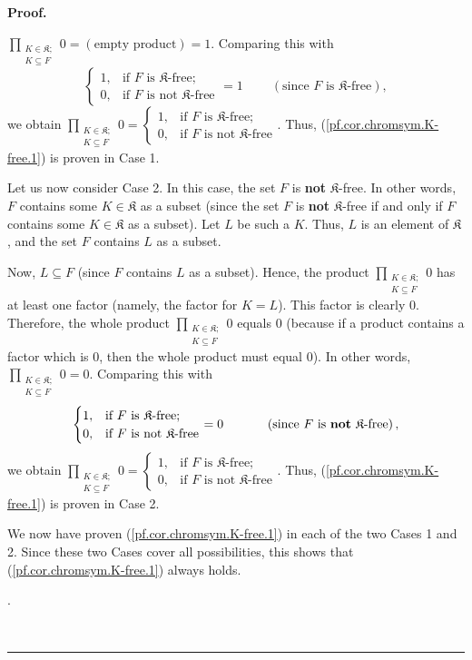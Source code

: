 \documentclass[numbers=enddot,12pt,final,onecolumn,notitlepage]{scrartcl}%
\theoremstyle{definition}
\newenvironment{proof}[1][Proof]{\noindent\textbf{#1.} }{\ \rule{0.5em}{0.5em}}
\newenvironment{verlong}{}{}
\let\prodnonlimits\prod
\renewcommand{\prod}{\prodnonlimits\limits}
\begin{document}
\begin{verlong}
\begin{proof}
{$\prod_{\substack{K\in\mathfrak{K};\\K\subseteq F}}0=\left(  \text{empty
product}\right)  =1$. Comparing this with
\[%
\begin{cases}
1, & \text{if }F\text{ is }\mathfrak{K}\text{-free;}\\
0, & \text{if }F\text{ is not }\mathfrak{K}\text{-free}%
\end{cases}
=1\ \ \ \ \ \ \ \ \ \ \left(  \text{since }F\text{ is }\mathfrak{K}%
\text{-free}\right)  ,
\]
we obtain $\prod_{\substack{K\in\mathfrak{K};\\K\subseteq F}}0=%
\begin{cases}
1, & \text{if }F\text{ is }\mathfrak{K}\text{-free;}\\
0, & \text{if }F\text{ is not }\mathfrak{K}\text{-free}%
\end{cases}
$. Thus, (\ref{pf.cor.chromsym.K-free.1}) is proven in Case 1.
\par
Let us now consider Case 2. In this case, the set $F$ is \textbf{not}
$\mathfrak{K}$-free. In other words, $F$ contains some $K\in\mathfrak{K}$ as a
subset (since the set $F$ is \textbf{not} $\mathfrak{K}$-free if and only if
$F$ contains some $K\in\mathfrak{K}$ as a subset). Let $L$ be such a $K$.
Thus, $L$ is an element of $\mathfrak{K}$, and the set $F$ contains $L$ as a
subset.
\par
Now, $L\subseteq F$ (since $F$ contains $L$ as a subset). Hence, the product
$\prod_{\substack{K\in\mathfrak{K};\\K\subseteq F}}0$ has at least one factor
(namely, the factor for $K=L$). This factor is clearly $0$. Therefore, the
whole product $\prod_{\substack{K\in\mathfrak{K};\\K\subseteq F}}0$ equals $0$
(because if a product contains a factor which is $0$, then the whole product
must equal $0$). In other words, $\prod_{\substack{K\in\mathfrak{K}%
;\\K\subseteq F}}0=0$. Comparing this with
\[%
\begin{cases}
1, & \text{if }F\text{ is }\mathfrak{K}\text{-free;}\\
0, & \text{if }F\text{ is not }\mathfrak{K}\text{-free}%
\end{cases}
=0\ \ \ \ \ \ \ \ \ \ \left(  \text{since }F\text{ is \textbf{not}
}\mathfrak{K}\text{-free}\right)  ,
\]
we obtain $\prod_{\substack{K\in\mathfrak{K};\\K\subseteq F}}0=%
\begin{cases}
1, & \text{if }F\text{ is }\mathfrak{K}\text{-free;}\\
0, & \text{if }F\text{ is not }\mathfrak{K}\text{-free}%
\end{cases}
$. Thus, (\ref{pf.cor.chromsym.K-free.1}) is proven in Case 2.
\par
We now have proven (\ref{pf.cor.chromsym.K-free.1}) in each of the two Cases 1
and 2. Since these two Cases cover all possibilities, this shows that
(\ref{pf.cor.chromsym.K-free.1}) always holds.}.


\end{proof}
\end{verlong}
\end{document}
